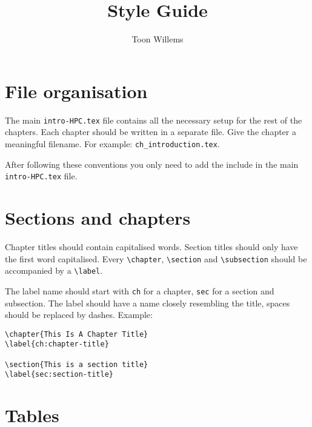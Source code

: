 \documentclass[11pt,a4paper]{article}
\title{Style Guide}
\author{Toon Willems}
\begin{document}
\maketitle

\section{File organisation}
\label{sec:file-organisation}

The main \texttt{intro-HPC.tex} file contains all the necessary setup for the rest of
the chapters. Each chapter should be written in a separate file. Give the
chapter a meaningful filename. For example: \texttt{ch\_introduction.tex}.

After following these conventions you only need to add the include in the main
\texttt{intro-HPC.tex} file.

\section{Sections and chapters}
\label{sec:sections-and-chapters}

Chapter titles should contain capitalised words. Section titles should only
have the first word capitalised. Every \texttt{\textbackslash{}chapter},
\texttt{\textbackslash{}section} and \texttt{\textbackslash{}subsection} should
be accompanied by a \texttt{\textbackslash{}label}.

The label name should start with \texttt{ch} for a chapter, \texttt{sec} for a
section and subsection. The label should have a name closely resembling the
title, spaces should be replaced by dashes. Example:

\begin{verbatim}
\chapter{This Is A Chapter Title}
\label{ch:chapter-title}

\section{This is a section title}
\label{sec:section-title}
\end{verbatim}

\section{Tables}
\label{sec:tables}
\end{document}
